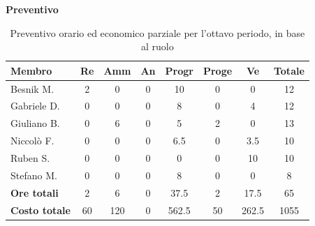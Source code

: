 \documentclass[a4paper,10pt]{article}
\begin{document}
\textbf{Preventivo} \\
\begin{table}[H]
\centering
\begin{tabular}{|l|c|c|c|c|c|c|c|}
\hline
\textbf{Membro} & \textbf{Re} & \textbf{Amm} & \textbf{An} & \textbf{Progr} & \textbf{Proge} & \textbf{Ve} & \textbf{Totale} \\
\hline
Besnik M.   & 2   & 0   & 0 & 10   & 0 & 0 & 12 \\
Gabriele D. & 0   & 0   & 0 & 8   & 0 & 4  & 12 \\
Giuliano B. & 0   & 6   & 0 & 5   & 2 & 0  & 13 \\
Niccolò F.  & 0   & 0   & 0 & 6.5   & 0 & 3.5  & 10 \\
Ruben S.    & 0   & 0   & 0 & 0   & 0 & 10  & 10 \\
Stefano M.  & 0   & 0   & 0 & 8   & 0 & 0  & 8 \\
\hline
\textbf{Ore totali} & 2  & 6 & 0 & 37.5  & 2  & 17.5 & 65 \\
\hline
\textbf{Costo totale} & 60  & 120 & 0 & 562.5  & 50  & 262.5 & 1055 \\
\hline
\end{tabular}
\caption{Preventivo orario ed economico parziale per l'ottavo periodo, in base al ruolo}
\end{table}
\end{document}
